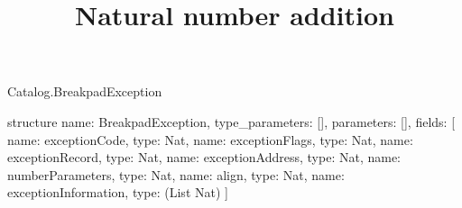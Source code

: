 \begin{lexlean}{Catalog.BreakpadException}
\title{Natural number addition}
\begin{semanticmodule}
structure{
  name: BreakpadException,
  type_parameters: [],
  parameters: [],
  fields: [
    {name: exceptionCode, type: Nat},
    {name: exceptionFlags, type: Nat},
    {name: exceptionRecord, type: Nat},
    {name: exceptionAddress, type: Nat},
    {name: numberParameters, type: Nat},
    {name: align, type: Nat},
    {name: exceptionInformation, type: (List Nat)}
  ]
}
\end{semanticmodule}
\end{lexlean}
